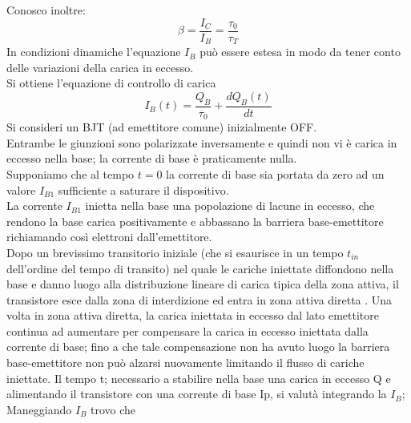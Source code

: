 Conosco inoltre:
%
\begin{equation}
    \beta=\dfrac{I_C}{I_B}=\dfrac{\tau_0}{\tau_T} \nonumber
\end{equation}
%
In condizioni dinamiche l'equazione $I_B$ può
essere estesa in modo da tener conto delle variazioni della carica in eccesso. \\
Si ottiene l'equazione di controllo di carica
%
\begin{equation}
    I_B(t) = \dfrac{Q_B}{\tau_0} + \dfrac{dQ_B(t)}{dt}
\end{equation}
%
Si consideri un BJT (ad emettitore comune) inizialmente OFF. \\
Entrambe le giunzioni sono
polarizzate inversamente e quindi non vi è carica in eccesso nella base; la corrente
di base è praticamente nulla.\\
Supponiamo che al tempo $t = 0$ la corrente di base sia portata da zero ad un valore $I_{B1}$ sufficiente a saturare il dispositivo. \\
La corrente $I_{B1}$ inietta nella base una popolazione di lacune in eccesso, che rendono la
base carica positivamente e abbassano la barriera base-emettitore richiamando così
elettroni dall'emettitore. \\
Dopo un brevissimo transitorio iniziale (che si esaurisce
in un tempo $t_{in}$ dell'ordine del tempo di transito) nel quale le cariche iniettate
diffondono nella base e danno luogo alla distribuzione lineare di carica tipica della
zona attiva, il transistore esce dalla zona di interdizione ed entra in zona attiva
diretta . Una volta in zona attiva diretta, la carica iniettata in
eccesso dal lato emettitore continua ad aumentare per compensare la carica in
eccesso iniettata dalla corrente di base; fino a che tale compensazione non ha
avuto luogo la barriera base-emettitore non può alzarsi nuovamente limitando il
flusso di cariche iniettate.
Il tempo t; necessario a stabilire nella base una carica in eccesso Q e alimentando il transistore con una corrente di base Ip, si valutà integrando la $I_B$;
Maneggiando $I_B$ trovo che


